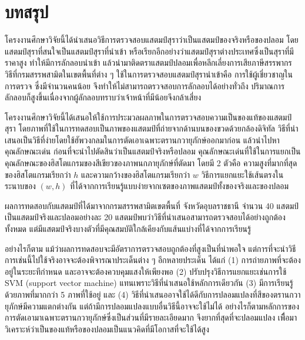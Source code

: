 \chapter{บทสรุป}
โครงงานศึกษาวิจัยนี้ได้นำเสนอวิธีการตรวจสอบแสตมป์สุราว่าเป็นแสตมป์ของจริงหรือของปลอม โดยแสตมป์สุราที่สนใจเป็นแสตมป์สุราที่นำเข้า หรือเรียกอีกอย่างว่าแสตมป์สุราต่างประเทศซึ่งเป็นสุราที่มีราคาสูง ทำให้มีการลักลอบนำเข้า แล้วนำมาติดตราแสตมป์ปลอมเพื่อหลีกเลี่ยงการเสียภาษีสรรพากร 
วิธีที่กรมสรรพสามิตในเขตพื้นที่ต่าง ๆ ใช้ในการตรวจสอบแสตมป์สุรานำเข้าคือ การใช้ผู้เชี่ยวชาญในการตรวจ ซึ่งมีจำนวนคนน้อย จึงทำให้ไม่สามารถตรวจสอบการลักลอบได้อย่างทั่วถึง ปริมาณการลักลอบก็สูงขึ้นเนื่องจากผู้ลักลอบทราบว่าเจ้าหน้าที่มีน้อยจึงกล้าเสี่ยง

โครงงานศึกษาวิจัยนี้ได้เสนอให้ใช้การประมวลผลภาพในการตรวจสอบความเป็นของแท้ของแสตมป์สุรา โดยภาพที่ใช้ในการทดสอบเป็นภาพของแสตมป์ที่ถ่ายจากด้านบนของขวดด้วยกล้องดิจิทัล วิธีที่นำเสนอเป็นวิธีที่ง่ายโดยใช้ฮัพวงกลมในการตัดเอาเฉพาะตรานกวายุภักษ์ออกมาก่อน แล้วนำไปหาคุณลักษณะเด่น ก่อนที่จะนำไปตัดสินว่าเป็นแสตมป์จริงหรือปลอม คุณลักษณะเด่นที่ใช้ในการแยกเป็นคุณลักษณะของฮิสโตแกรมของสีเขียวของภาพนกภายุภักษ์ที่ตัดมา โดยมี 2 ตัวคือ ความสูงที่มากที่สุดของฮิสโตแกรมเรียกว่า $h$ และความกว้างของฮิสโตแกรมเรียกว่า $w$ วิธีการแยกแยะใช้เส้นตรงในระนาบของ $(w,h)$ ที่ได้จากการเรียนรู้แบบง่ายจากเซตของภาพแสตมป์ทั้งของจริงและของปลอม

ผลการทดสอบกับแสตมป์ที่ได้มาจากกรมสรรพสามิตเขตพื้นที่ จังหวัดอุบลราชธานี จำนวน 40 แสตมป์ เป็นแสตมป์จริงและปลอมอย่างละ 20 แสตมป์พบว่าวิธีที่นำเสนอสามารถตรวจสอบได้อย่างถูกต้องทั้งหมด แต่มีแสตมป์จริงบางตัวที่มีคุณสมบัติใกล้เคียงกับแส้นแบ่างที่ได้จากการเรียนรู้

อย่างไรก็ตาม แม้ว่าผลการทดสอบจะมีอัตราการตรวจสอบถูกต้องที่สูงเป็นที่น่าพอใจ แต่การที่จะนำวิธีการเช่นนี้ไปใช้จริงอาจจะต้องพิจารณาประเด็นต่าง ๆ อีกหลายประเด็น ได้แก่  (1) การถ่ายภาพที่จะต้องอยู่ในระยะทีกำหนด และอาจจะต้องควบคุมแสงให้เพียงพอ (2) ปรับปรุงวิธีการแยกแยะเช่นการใช้ SVM (support vector machine) แทนเพราะวิธีที่นำเสนอใช้หลักการเดียวกัน (3) มีการเรียนรู้ด้วยภาพที่มากกว่า 5 ภาพที่ใช้อยู่ และ (4) วิธีที่นำเสนออาจใช้ได้ดีกับการปลอมแปลงที่สีของตรานกวายุภักษ์มีความแตกต่างกัน แต่ถ้ามีการปลอมแปลงแบบอื่นวิธีนี้อาจจะใช้ไม่ได้ อย่างไรก็ตามหลักการของการตัดเอามาเฉพาะตรานกวายุภักษ์ซึ่งเป็นส่วนที่มีรายละเอียดมาก จึงยากที่สุดที่จะปลอมแปลง เพีื่อมาวิเคราะห์ว่าเป็นของแท้หรือของปลอมเป็นแนวคิดที่มีโอกาสที่จะใช้ได้สูง


